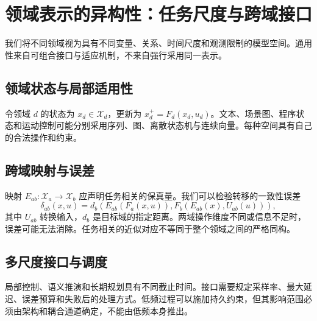 \chapter{领域表示的异构性：任务尺度与跨域接口}
\label{chp:domain_manifolds_heterogeneity}
\label{sec:manifold_of_language}
\label{sec:manifold_of_logic}
\label{sec:manifold_of_physics}
\label{sec:manifold_of_biochem}
\label{sec:manifold_of_society}
\label{sec:manifold_of_industry}
\label{sec:topological_shapeshifter}
我们将不同领域视为具有不同变量、关系、时间尺度和观测限制的模型空间。通用性来自可组合接口与适应机制，不来自强行采用同一表示。
\section{领域状态与局部适用性}
令领域 $d$ 的状态为 $x_d\in\mathcal X_d$，更新为 $x_d^+=F_d(x_d,u_d)$。文本、场景图、程序状态和运动控制可能分别采用序列、图、离散状态机与连续向量。每种空间具有自己的合法操作和约束。
\section{跨域映射与误差}
映射 $E_{ab}:\mathcal X_a\to\mathcal X_b$ 应声明任务相关的保真量。我们可以检验转移的一致性误差
\begin{equation}\delta_{ab}(x,u)=d_b\left(E_{ab}(F_a(x,u)),F_b(E_{ab}(x),U_{ab}(u))\right),\end{equation}
其中 $U_{ab}$ 转换输入，$d_b$ 是目标域的指定距离。两域操作维度不同或信息不足时，误差可能无法消除。任务相关的近似对应不等同于整个领域之间的严格同构。
\section{多尺度接口与调度}
局部控制、语义推演和长期规划具有不同截止时间。接口需要规定采样率、最大延迟、误差预算和失败后的处理方式。低频过程可以施加持久约束，但其影响范围必须由架构和耦合通道确定，不能由低频本身推出。
